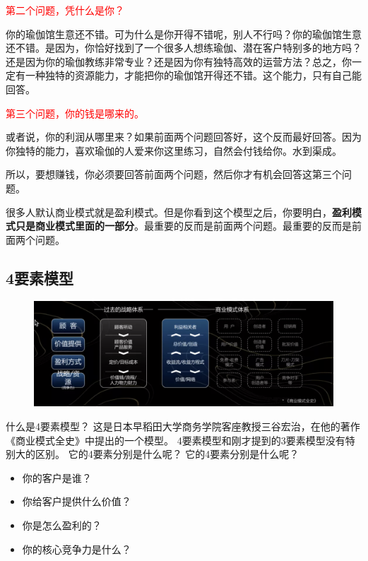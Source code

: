 \documentclass[12pt]{article}
\begin{document}
\textcolor{red}{第二个问题，凭什么是你？}

你的瑜伽馆生意还不错。可为什么是你开得不错呢，别人不行吗？你的瑜伽馆生意还不错。是因为，你恰好找到了一个很多人想练瑜伽、潜在客户特别多的地方吗？还是因为你的瑜伽教练非常专业？还是因为你有独特高效的运营方法？总之，你一定有一种独特的资源能力，才能把你的瑜伽馆开得还不错。这个能力，只有自己能回答。

\textcolor{red}{第三个问题，你的钱是哪来的。}

或者说，你的利润从哪里来？如果前面两个问题回答好，这个反而最好回答。因为你独特的能力，喜欢瑜伽的人爱来你这里练习，自然会付钱给你。水到渠成。

所以，要想赚钱，你必须要回答前面两个问题，然后你才有机会回答这第三个问题。

很多人默认商业模式就是盈利模式。但是你看到这个模型之后，你要明白，\textbf{盈利模式只是商业模式里面的一部分}。最重要的反而是前面两个问题。最重要的反而是前面两个问题。

\subsection{4要素模型}
\begin{figure}[H]
    \centering
    \includegraphics[width=1\textwidth]{fig/BusinessModel_3.png}
\end{figure}
什么是4要素模型？ 这是日本早稻田大学商务学院客座教授三谷宏治，在他的著作《商业模式全史》中提出的一个模型。 4要素模型和刚才提到的3要素模型没有特别大的区别。 它的4要素分别是什么呢？ 它的4要素分别是什么呢？ 

\begin{itemize}
\setlength{\itemsep}{0pt}
\setlength{\parsep}{0pt}
\setlength{\parskip}{0pt}
    \item 你的客户是谁？ 
    \item 你给客户提供什么价值？ 
    \item 你是怎么盈利的？  
    \item 你的核心竞争力是什么？ 
\end{itemize}
\end{document}
